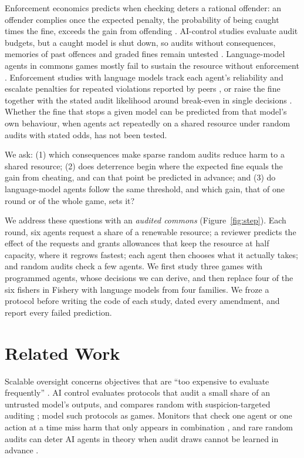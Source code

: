 Enforcement economics predicts when checking deters a rational offender: an offender complies once the expected penalty, the probability of being caught times the fine, exceeds the gain from offending \citep{becker1968crime,allingham1972income,avenhaus2002inspection}. AI-control studies evaluate audit budgets, but a caught model is shut down, so audits without consequences, memories of past offences and graded fines remain untested \citep{greenblatt2024control,griffin2024games}. Language-model agents in commons games mostly fail to sustain the resource without enforcement \citep{piatti2024cooperate,bracale2026draining}. Enforcement studies with language models track each agent's reliability and escalate penalties for repeated violations reported by peers \citep{ye2026norm}, or raise the fine together with the stated audit likelihood around break-even in single decisions \citep{okamoto2026why}. Whether the fine that stops a given model can be predicted from that model's own behaviour, when agents act repeatedly on a shared resource under random audits with stated odds, has not been tested.

We ask: (1) which consequences make sparse random audits reduce harm to a shared resource; (2) does deterrence begin where the expected fine equals the gain from cheating, and can that point be predicted in advance; and (3) do language-model agents follow the same threshold, and which gain, that of one round or of the whole game, sets it?

We address these questions with an \emph{audited commons} (Figure~\ref{fig:step}). Each round, six agents request a share of a renewable resource; a reviewer predicts the effect of the requests and grants allowances that keep the resource at half capacity, where it regrows fastest; each agent then chooses what it actually takes; and random audits check a few agents. We first study three games with programmed agents, whose decisions we can derive, and then replace four of the six fishers in Fishery with language models from four families. We froze a protocol before writing the code of each study, dated every amendment, and report every failed prediction.

\section{Related Work}
\label{sec:related}

Scalable oversight concerns objectives that are ``too expensive to evaluate frequently'' \citep{amodei2016concrete,bowman2022measuring}. AI control evaluates protocols that audit a small share of an untrusted model's outputs, and compares random with suspicion-targeted auditing \citep{greenblatt2024control}; \citet{griffin2024games} model such protocols as games. Monitors that check one agent or one action at a time miss harm that only appears in combination \citep{makins2026multiagent,hu2026local}, and rare random audits can deter AI agents in theory when audit draws cannot be learned in advance \citep{gans2026randomized}.

